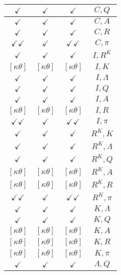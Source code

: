 \documentclass[a4paper,10pt]{article}
\begin{document}
\begin{longtable}{|c|c|c|c|}
\hline
$\checkmark$ & $\checkmark$ & $\checkmark$ & ${C},{Q}$ \\
\hline
$\checkmark$ & $\checkmark$ & $\checkmark$ & ${C},{A}$ \\
\hline
$\checkmark$ & $\checkmark$ & $\checkmark$ & ${C},{R}$ \\
\hline
$\checkmark\checkmark$ & $\checkmark$ & $\checkmark\checkmark$ & ${C},{\pi}$ \\
\hline
$\checkmark$ & $\checkmark$ & $\checkmark$ & ${I},{R^{K}}$ \\
\hline
$[\kappa \theta ]$ & $[\kappa \theta ]$ & $[\kappa \theta ]$ & ${I},{K}$ \\
\hline
$\checkmark$ & $\checkmark$ & $\checkmark$ & ${I},{\Lambda}$ \\
\hline
$\checkmark$ & $\checkmark$ & $\checkmark$ & ${I},{Q}$ \\
\hline
$\checkmark$ & $\checkmark$ & $\checkmark$ & ${I},{A}$ \\
\hline
$[\kappa \theta ]$ & $[\kappa \theta ]$ & $[\kappa \theta ]$ & ${I},{R}$ \\
\hline
$\checkmark\checkmark$ & $\checkmark$ & $\checkmark\checkmark$ & ${I},{\pi}$ \\
\hline
$\checkmark$ & $\checkmark$ & $\checkmark$ & ${R^{K}},{K}$ \\
\hline
$\checkmark$ & $\checkmark$ & $\checkmark$ & ${R^{K}},{\Lambda}$ \\
\hline
$\checkmark$ & $\checkmark$ & $\checkmark$ & ${R^{K}},{Q}$ \\
\hline
$[\kappa \theta ]$ & $[\kappa \theta ]$ & $[\kappa \theta ]$ & ${R^{K}},{A}$ \\
\hline
$[\kappa \theta ]$ & $[\kappa \theta ]$ & $[\kappa \theta ]$ & ${R^{K}},{R}$ \\
\hline
$\checkmark\checkmark$ & $\checkmark$ & $\checkmark\checkmark$ & ${R^{K}},{\pi}$ \\
\hline
$\checkmark$ & $\checkmark$ & $\checkmark$ & ${K},{\Lambda}$ \\
\hline
$\checkmark$ & $\checkmark$ & $\checkmark$ & ${K},{Q}$ \\
\hline
$[\kappa \theta ]$ & $[\kappa \theta ]$ & $[\kappa \theta ]$ & ${K},{A}$ \\
\hline
$[\kappa \theta ]$ & $[\kappa \theta ]$ & $[\kappa \theta ]$ & ${K},{R}$ \\
\hline
$[\kappa \theta ]$ & $[\kappa \theta ]$ & $[\kappa \theta ]$ & ${K},{\pi}$ \\
\hline
$\checkmark$ & $\checkmark$ & $\checkmark$ & ${\Lambda},{Q}$ \\

\end{longtable}
\end{document}

